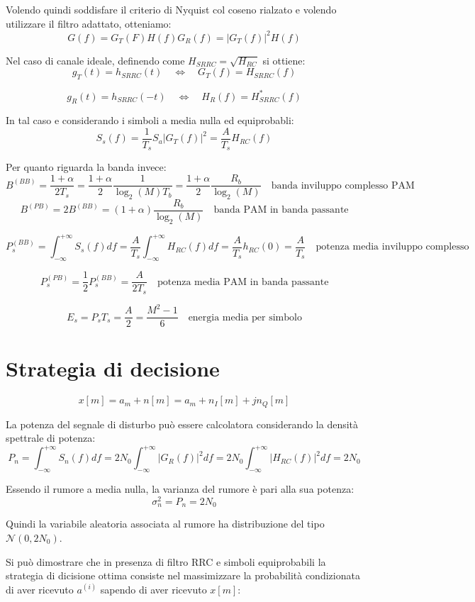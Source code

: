 Volendo quindi soddisfare il criterio di Nyquist col coseno rialzato e volendo utilizzare il filtro adattato, otteniamo:
\[
    G(f) = G_T(F) H(f) G_R(f) = |G_T(f)|^2 H(f)
\]

Nel caso di canale ideale, definendo come $H_{SRRC} = \sqrt{H_{RC}}$ si ottiene:
\[
    g_T(t) = h_{SRRC}(t) \quad \Longleftrightarrow \quad G_T(f) = H_{SRRC}(f) 
\]

\[
    g_R(t) = h_{SRRC}(-t) \quad \Longleftrightarrow \quad H_R(f) = H_{SRRC}^*(f)
\]


In tal caso e considerando i simboli a media nulla ed equiprobabli: 
\[
    S_s(f) = \frac{1}{T_s} S_a |G_T(f)|^2 = \frac{A}{T_s} H_{RC}(f)
\]


Per quanto riguarda la banda invece:
\[
    B^{(BB)} = \frac{1+\alpha}{2T_s} = \frac{1+\alpha}{2} \frac{1}{\log_2(M) T_b} = \frac{1+\alpha}{2} \frac{R_b}{\log_2(M)} \quad \text{banda inviluppo complesso PAM}
\]
\[
    B^{(PB)} = 2 B^{(BB)} = (1+\alpha) \frac{R_b}{\log_2(M)} \quad \text{banda PAM in banda passante}
\]

\[
    P_s^{(BB)} = \int_{-\infty}^{+\infty} S_s(f) df = \frac{A}{T_s} \int_{-\infty}^{+\infty} H_{RC}(f) df = \frac{A}{T_s} h_{RC}(0) = \frac{A}{T_s} \quad \text{potenza media inviluppo complesso}
\]

\[
    P_s^{(PB)} = \frac{1}{2} P_s^{(BB)} = \frac{A}{2T_s} \quad \text{potenza media PAM in banda passante}
\]

\[
    E_s = P_s T_s = \frac{A}{2} = \frac{M^2 - 1}{6} \quad \text{energia media per simbolo}
\]


\section*{Strategia di decisione}


\[
    x[m] = a_m + n[m] = a_m + n_I[m] + jn_Q[m]
\]  

La potenza del segnale di disturbo può essere calcolatora considerando la densità spettrale di potenza:
\[
    P_n = \int_{-\infty}^{+\infty} S_n(f) df = 2N_0 \int_{-\infty}^{+\infty} |G_R(f)|^2 df = 2N_0 \int_{-\infty}^{+\infty} |H_{RC}(f)|^2 df = 2N_0
\]

Essendo il rumore a media nulla, la varianza del rumore è pari alla sua potenza:
\[
    \sigma_n^2 = P_n = 2N_0
\]

Quindi la variabile aleatoria associata al rumore ha distribuzione del tipo $\mathcal{N}(0, 2 N_0)$.

Si può dimostrare che in presenza di filtro RRC e simboli equiprobabili la strategia di dicisione ottima consiste nel massimizzare la probabilità condizionata di aver ricevuto $a^{(i)}$ sapendo di aver ricevuto $x[m]$:

